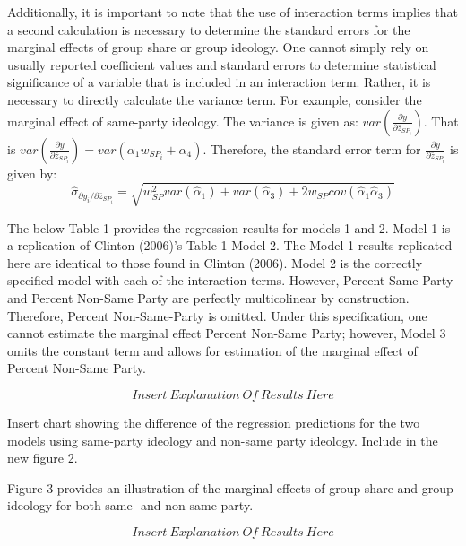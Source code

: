 \documentclass[10pt,letterpaper]{article}
\begin{document}
Additionally, it is important to note that the use of interaction terms implies that a second calculation is necessary to determine the standard errors for the marginal effects of group share or group ideology. One cannot simply rely on usually reported coefficient values and standard errors to determine statistical significance of a variable that is included in an interaction term. Rather, it is necessary to directly calculate the variance term. For example, consider the marginal effect of same-party ideology. The variance is given as:  $var(\frac{\partial y}{\partial \bar{z}_{SP_i}})$. That is $var(\frac{\partial y}{\partial \bar{z}_{SP_i}}) = var(\alpha_1 w_{SP_i} + \alpha_4)$. Therefore, the standard error term for $\frac{\partial y}{\partial \bar{z}_{SP_i}}$ is given by:
$$\hat{\sigma}_{\partial y_i / \partial \bar{z}_{SP_i}} = \sqrt{w_{SP}^2var(\hat{\alpha}_1)+var(\hat{\alpha}_3)+2w_{SP}cov(\hat{\alpha}_1\hat{\alpha}_3)}$$

The below Table 1 provides the regression results for models 1 and 2. Model 1 is a replication of Clinton (2006)'s Table 1 Model 2. The Model 1 results replicated here are identical to those found in Clinton (2006). Model 2 is the correctly specified model with each of the interaction terms. However, Percent Same-Party and Percent Non-Same Party are perfectly multicolinear by construction. Therefore, Percent Non-Same-Party is omitted. Under this specification, one cannot estimate the marginal effect Percent Non-Same Party; however, Model 3 omits the constant term and allows for estimation of the marginal effect of Percent Non-Same Party.

$$Insert ~ Explanation~Of~Results~Here$$

Insert chart showing the difference of the regression predictions for the two models using same-party ideology and non-same party ideology. Include in the new figure 2.

Figure 3 provides an illustration of the marginal effects of group share and group ideology for both same- and non-same-party.

$$Insert ~ Explanation~Of~Results~Here$$


\end{document}
